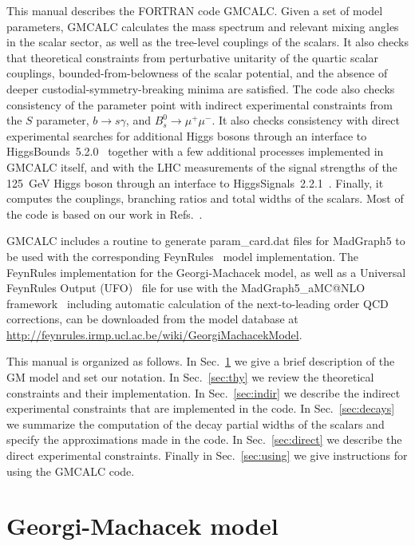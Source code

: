 \documentclass[11pt]{article}
\begin{document}
This manual describes the FORTRAN code GMCALC.  Given a set of model parameters, GMCALC calculates the mass spectrum and relevant mixing angles in the scalar sector, as well as the tree-level couplings of the scalars.  It also checks that theoretical constraints from perturbative unitarity of the quartic scalar couplings, bounded-from-belowness of the scalar potential, and the absence of deeper custodial-symmetry-breaking minima are satisfied.  The code also checks consistency of the parameter point with indirect experimental constraints from the $S$ parameter, $b \to s \gamma$, and $B_s^0 \to \mu^+\mu^-$.  It also checks consistency with direct experimental searches for additional Higgs bosons through an interface to HiggsBounds~5.2.0~\cite{Bechtle:2013wla} together with a few additional processes implemented in GMCALC itself, and with the LHC measurements of the signal strengths of the 125~GeV Higgs boson through an interface to HiggsSignals~2.2.1~\cite{Bechtle:2013xfa}.  Finally, it computes the couplings, branching ratios and total widths of the scalars.  Most of the code is based on our work in Refs.~\cite{HKL,indirect,loops}.

GMCALC includes a routine to generate param\_card.dat files for MadGraph5 to be used with the corresponding FeynRules~\cite{Alloul:2013bka} model implementation.  The FeynRules implementation for the Georgi-Machacek model, as well as a Universal FeynRules Output (UFO)~\cite{Degrande:2011ua} file for use with the MadGraph5\_aMC@NLO framework~\cite{Alwall:2014hca} including automatic calculation of the next-to-leading order QCD corrections, can be downloaded from the model database at 
\url{http://feynrules.irmp.ucl.ac.be/wiki/GeorgiMachacekModel}.

This manual is organized as follows.  In Sec.~\ref{sec:model} we give a brief description of the GM model and set our notation.  In Sec.~\ref{sec:thy} we review the theoretical constraints and their implementation.  In Sec.~\ref{sec:indir} we describe the indirect experimental constraints that are implemented in the code.  In Sec.~\ref{sec:decays} we summarize the computation of the decay partial widths of the scalars and specify the approximations made in the code.  In Sec.~\ref{sec:direct} we describe the direct experimental constraints.  Finally in Sec.~\ref{sec:using} we give instructions for using the GMCALC code.


\section{Georgi-Machacek model}
\label{sec:model}
\end{document}
